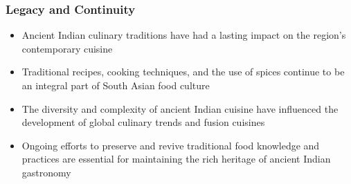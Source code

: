 \begin{frame}[fragile]\frametitle{Legacy and Continuity}
    \begin{itemize}
        \item Ancient Indian culinary traditions have had a lasting impact on the region's contemporary cuisine
        \item Traditional recipes, cooking techniques, and the use of spices continue to be an integral part of South Asian food culture
        \item The diversity and complexity of ancient Indian cuisine have influenced the development of global culinary trends and fusion cuisines
        \item Ongoing efforts to preserve and revive traditional food knowledge and practices are essential for maintaining the rich heritage of ancient Indian gastronomy
    \end{itemize}
\end{frame}

